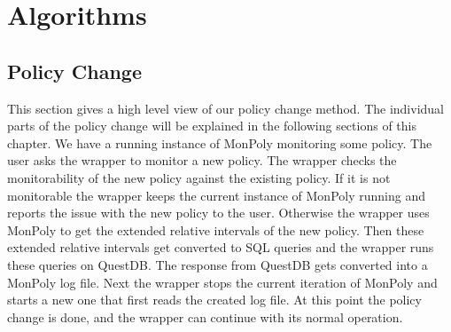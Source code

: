 \chapter{Algorithms}

\section{Policy Change}
This section gives a high level view of our policy change method.
The individual parts of the policy change will be explained in the following sections of this chapter.
We have a running instance of MonPoly monitoring some policy.
The user asks the wrapper to monitor a new policy.
The wrapper checks the monitorability of the new policy against the existing policy.
If it is not monitorable the wrapper keeps the current instance of MonPoly running and reports the issue with the new policy to the user.
Otherwise the wrapper uses MonPoly to get the extended relative intervals of the new policy.
Then these extended relative intervals get converted to SQL queries and the wrapper runs these queries on QuestDB.
The response from QuestDB gets converted into a MonPoly log file.
Next the wrapper stops the current iteration of MonPoly and starts a new one that first reads the created log file.
At this point the policy change is done, and the wrapper can continue with its normal operation.







